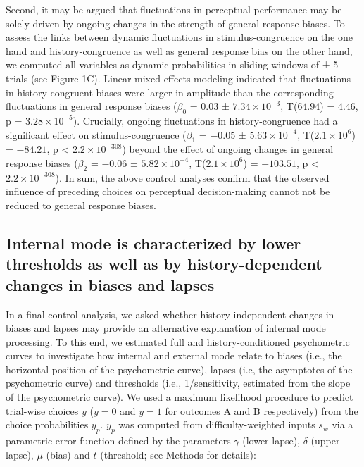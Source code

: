 \documentclass[
]{article}
\begin{document}
Second, it may be argued that fluctuations in perceptual performance may
be solely driven by ongoing changes in the strength of general response
biases. To assess the links between dynamic fluctuations in
stimulus-congruence on the one hand and history-congruence as well as
general response bias on the other hand, we computed all variables as
dynamic probabilities in sliding windows of ± 5 trials (see Figure 1C).
Linear mixed effects modeling indicated that fluctuations in
history-congruent biases were larger in amplitude than the corresponding
fluctuations in general response biases (\(\beta_0\) = \(0.03\) ±
\(\ensuremath{7.34\times 10^{-3}}\), T(\(64.94\)) = \(4.46\), p =
\(\ensuremath{3.28\times 10^{-5}}\)). Crucially, ongoing fluctuations in
history-congruence had a significant effect on stimulus-congruence
(\(\beta_1\) = \(-0.05\) ± \(\ensuremath{5.63\times 10^{-4}}\),
T(\(\ensuremath{2.1\times 10^{6}}\)) = \(-84.21\), p < \(\ensuremath{2.2\times 10^{-308}}\)) beyond the
effect of ongoing changes in general response biases (\(\beta_2\) =
\(-0.06\) ± \(\ensuremath{5.82\times 10^{-4}}\),
T(\(\ensuremath{2.1\times 10^{6}}\)) = \(-103.51\), p < \(\ensuremath{2.2\times 10^{-308}}\)). In sum,
the above control analyses confirm that the observed influence of
preceding choices on perceptual decision-making cannot not be reduced to
general response biases.

\hypertarget{internal-mode-is-characterized-by-lower-thresholds-as-well-as-by-history-dependent-changes-in-biases-and-lapses}{%
\subsection{Internal mode is characterized by lower thresholds as well
as by history-dependent changes in biases and
lapses}\label{internal-mode-is-characterized-by-lower-thresholds-as-well-as-by-history-dependent-changes-in-biases-and-lapses}}

In a final control analysis, we asked whether history-independent
changes in biases and lapses may provide an alternative explanation of
internal mode processing. To this end, we estimated full and
history-conditioned psychometric curves to investigate how internal and
external mode relate to biases (i.e., the horizontal position of the
psychometric curve), lapses (i.e, the asymptotes of the psychometric
curve) and thresholds (i.e., 1/sensitivity, estimated from the slope of
the psychometric curve). We used a maximum likelihood procedure to
predict trial-wise choices \(y\) (\(y = 0\) and \(y = 1\) for outcomes A
and B respectively) from the choice probabilities \(y_p\). \(y_p\) was
computed from difficulty-weighted inputs \(s_w\) via a parametric error
function defined by the parameters \(\gamma\) (lower lapse), \(\delta\)
(upper lapse), \(\mu\) (bias) and \(t\) (threshold; see Methods for
details):
\end{document}
